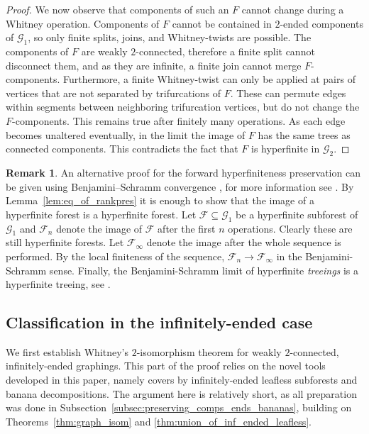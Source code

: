\documentclass{article}
\theoremstyle{plain}
\theoremstyle{definition}
\newtheorem{rem}[thm]{Remark}
\newcommand{\cG}{\mathcal{G}}
\newcommand{\cF}{\mathcal{F}}
\begin{document}
\begin{proof}
    We now observe that components of such an $F$ cannot change during a Whitney operation. Components of $F$ cannot be contained in $2$-ended components of $\cG_1$, so only finite splits, joins, and Whitney-twists are possible. The components of $F$ are weakly $2$-connected, therefore a finite split cannot disconnect them, and as they are infinite, a finite join cannot merge $F$-components. Furthermore, a finite Whitney-twist can only be applied at pairs of vertices that are not separated by trifurcations of $F$. These can permute edges within segments between neighboring trifurcation vertices, but do not change the $F$-components. This remains true after finitely many operations. As each edge becomes unaltered eventually, in the limit the image of $F$ has the same trees as connected components. This contradicts the fact that $F$ is hyperfinite in $\cG_2$.
\end{proof}


\begin{rem}
   An alternative proof for the forward hyperfiniteness preservation can be given using Benjamini--Schramm convergence \cite{benjamini2001recurrence}, for more information see \cite{lovasz2012large}. By Lemma~\ref{lem:eq_of_rankpres} it is enough to show that the image of a hyperfinite forest is a hyperfinite forest. Let $\cF\subseteq \cG_1$ be a hyperfinite subforest of $\cG_1$ and $\cF_n$ denote the image of $\cF$ after the first $n$ operations. Clearly these are still hyperfinite forests. Let $\cF_{\infty}$ denote the image after the whole sequence is performed. By the local finiteness of the sequence, $\cF_n \to \cF_{\infty}$ in the Benjamini-Schramm sense. Finally, the Benjamini-Schramm limit of hyperfinite \emph{treeings} is a hyperfinite treeing, see \cite{schramm2011hyperfinite, aldous2007processes}.
\end{rem}



\subsection{Classification in the infinitely-ended case}

We first establish Whitney's $2$-isomorphism theorem for weakly $2$-connected, infinitely-ended graphings. This part of the proof relies on the novel tools developed in this paper, namely covers by infinitely-ended leafless subforests and banana decompositions. The argument here is relatively short, as all preparation was done in Subsection~\ref{subsec:preserving_comps_ends_bananas}, building on Theorems~\ref{thm:graph_isom} and \ref{thm:union_of_inf_ended_leafless}.
\end{document}
